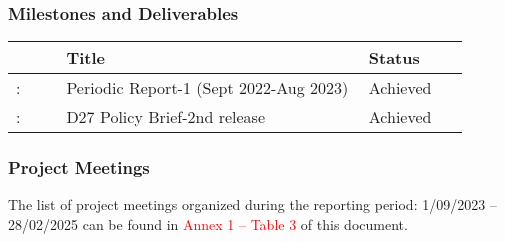 
\subsubsection*{Milestones and Deliverables}

{\fontsize{9}{11}\selectfont
\begin{center}
  \begin{tabular}[t]{!{\color{mygray}\vrule}p{0.10\linewidth}!
  {\color{mygray}\vrule}p{0.60\linewidth}!
  {\color{mygray}\vrule}p{0.20\linewidth}!{\color{mygray}\vrule} } \hline
     & {\bf Title} & {\bf Status} \\ \hline
    : & Periodic Report-1 (Sept 2022-Aug 2023) &  Achieved\\ \hline
   : & D27 Policy Brief-2nd release &  Achieved\\ \hline 
  \end{tabular}
\end{center}
}

\subsubsection*{Project Meetings}
The list of project meetings organized during the reporting period: 1/09/2023 – 28/02/2025 can be found in \textcolor{red}{Annex 1 – Table 3} of this document.



